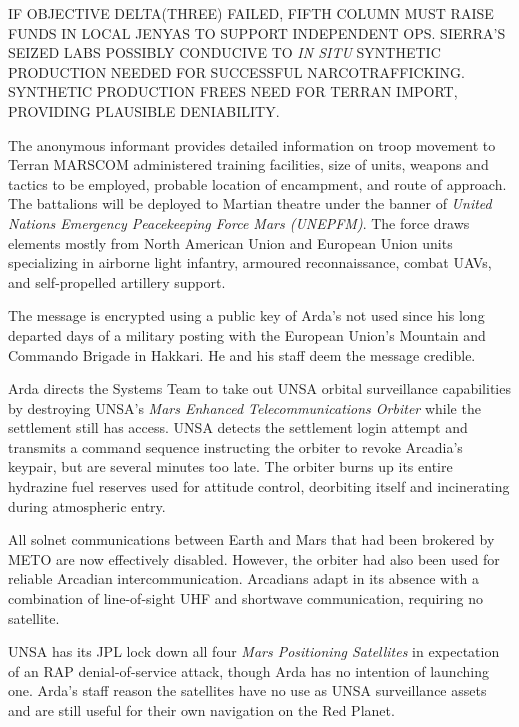    \item IF OBJECTIVE DELTA(THREE) FAILED, FIFTH COLUMN MUST RAISE FUNDS IN LOCAL JENYAS TO SUPPORT INDEPENDENT OPS. SIERRA'S SEIZED LABS POSSIBLY CONDUCIVE TO {\it IN SITU} SYNTHETIC PRODUCTION NEEDED FOR SUCCESSFUL NARCOTRAFFICKING. SYNTHETIC PRODUCTION FREES NEED FOR TERRAN IMPORT, PROVIDING PLAUSIBLE DENIABILITY.
    \stopitemize
\stopitemize
\stopTimelineCorrespondenceDocument

The anonymous informant provides detailed information on troop movement to Terran MARSCOM administered training facilities, size of units, weapons and tactics to be employed, probable location of encampment, and route of approach. The battalions will be deployed to Martian theatre under the banner of {\it United Nations Emergency Peacekeeping Force Mars (UNEPFM)}. The force draws elements mostly from North American Union and European Union units specializing in airborne light infantry, armoured reconnaissance, combat UAVs, and self-propelled artillery support.

The message is encrypted using a public key of Arda's not used since his long departed days of a military posting with the European Union's Mountain and Commando Brigade in Hakkari. He and his staff deem the message credible.
\StopTimelineDate

Arda directs the Systems Team to take out UNSA orbital surveillance capabilities by destroying UNSA's {\it Mars Enhanced Telecommunications Orbiter} while the settlement still has access. UNSA detects the settlement login attempt and transmits a command sequence instructing the orbiter to revoke Arcadia's keypair, but are several minutes too late. The orbiter burns up its entire hydrazine fuel reserves used for attitude control, deorbiting itself and incinerating during atmospheric entry.

All solnet communications between Earth and Mars that had been brokered by METO are now effectively disabled. However, the orbiter had also been used for reliable Arcadian intercommunication. Arcadians adapt in its absence with a combination of line-of-sight UHF and shortwave communication, requiring no satellite.

UNSA has its JPL lock down all four {\it Mars Positioning Satellites} in expectation of an RAP denial-of-service attack, though Arda has no intention of launching one. Arda's staff reason the satellites have no use as UNSA surveillance assets and are still useful for their own navigation on the Red Planet.
\StopTimelineDate

